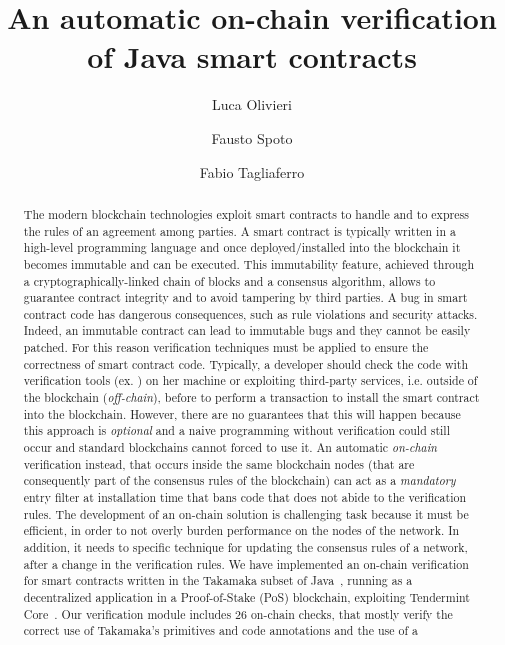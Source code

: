 \documentclass{easychair}
\title{An automatic on-chain verification of Java smart contracts}
\author{
Luca Olivieri\inst{1,2}
\and
Fausto Spoto\inst{1}
\and
Fabio Tagliaferro\inst{1}
}
\institute{
  Università degli Studi di Verona, Italy\\
  \email{\{luca.olivieri, fausto.spoto, fabio.tagliaferro\}@univr.it}
\and
   Corvallis S.r.l., Padova, Italy\\
 }
\begin{document}
\maketitle

\begin{abstract}

  The modern blockchain technologies exploit smart contracts to handle and to express the rules of an agreement among parties.
  A smart contract is typically written in a high-level programming language and once deployed/installed into the blockchain 
  it becomes immutable and can be executed. This immutability feature, achieved through a cryptogra\-phically-linked chain of blocks and a consensus algorithm, 
  allows to guarantee contract integrity and to avoid tampering by third parties. A bug in smart contract code has dangerous consequences, such as rule violations 
  and security attacks. Indeed, an immutable contract can lead to immutable bugs and they cannot be easily patched.
  For this reason verification techniques must be applied to ensure the correctness of smart contract code. Typically, a developer should check the code with 
  verification tools (ex. \cite{TIGR21, GriecoSCFG20, FeistGG19}) on her machine or exploiting third-party services, i.e. outside of the blockchain (\emph{off-chain}), before to perform a transaction to 
  install the smart contract into the blockchain. However, there are no guarantees that this will happen because this approach is \emph{optional} and a naive 
   programming without verification could still occur and standard blockchains cannot forced to use it. An automatic \emph{on-chain} verification 
  instead, that occurs inside the same blockchain nodes (that are consequently part of the consensus rules of the blockchain) can act as a \emph{mandatory} entry filter at installation time
  that bans code that does not abide to the verification rules. The development of an on-chain solution is 
  challenging task because it must be efficient, in order to not overly burden performance on the nodes of the network. In addition, it needs to specific technique 
  for updating the consensus rules of a network, after a change in the verification rules. We have implemented an on-chain verification for smart contracts written 
  in the Takamaka subset of Java~\cite{Spoto19}, running as a decentralized application in a Proof-of-Stake (PoS) blockchain, exploiting Tendermint Core~\cite{abci}. 
  Our verification module includes $26$ on-chain checks, that mostly verify the correct use of Takamaka's primitives and code annotations and the use of a 

\end{abstract}
\end{document}
